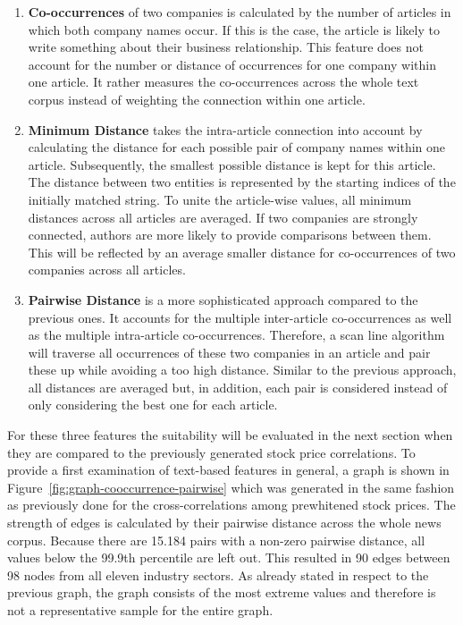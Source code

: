 \begin{enumerate}[
leftmargin=0pt, itemindent=20pt,
labelwidth=15pt, labelsep=5pt, listparindent=0.7cm,
align=left, label={\textbf{(\arabic*)}}]
\item \textbf{Co-occurrences} of two companies is calculated by the number of articles in which both company names occur. If this is the case, the article is likely to write something about their business relationship. This feature does not account for the number or distance of occurrences for one company within one article. It rather measures the co-occurrences across the whole text corpus instead of weighting the connection within one article.
\item \textbf{Minimum Distance} takes the intra-article connection into account by calculating the distance for each possible pair of company names within one article. Subsequently, the smallest possible distance is kept for this article. The distance between two entities is represented by the starting indices of the initially matched string. To unite the article-wise values, all minimum distances across all articles are averaged. If two companies are strongly connected, authors are more likely to provide comparisons between them. This will be reflected by an average smaller distance for co-occurrences of two companies across all articles.
\item \textbf{Pairwise Distance} is a more sophisticated approach compared to the previous ones. It accounts for the multiple inter-article co-occurrences as well as the multiple intra-article co-occurrences. Therefore, a scan line algorithm will traverse all occurrences of these two companies in an article and pair these up while avoiding a too high distance. Similar to the previous approach, all distances are averaged but, in addition, each pair is considered instead of only considering the best one for each article.
\end{enumerate}

For these three features the suitability will be evaluated in the next section when they are compared to the previously generated stock price correlations. To provide a first examination of text-based features in general, a graph is shown in Figure~\ref{fig:graph-cooccurrence-pairwise} which was generated in the same fashion as previously done for the cross-correlations among prewhitened stock prices. The strength of edges is calculated by their pairwise distance across the whole news corpus. Because there are 15.184 pairs with a non-zero pairwise distance, all values below the 99.9th percentile are left out. This resulted in 90 edges between 98 nodes from all eleven industry sectors. As already stated in respect to the previous graph, the graph consists of the most extreme values and therefore is not a representative sample for the entire graph.

